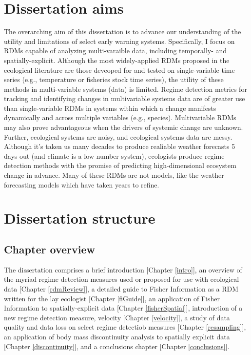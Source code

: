 \documentclass[12pt,twoside,openany]{reedthesis}
\begin{document}
\hypertarget{dissertation-aims}{%
\section{Dissertation aims}\label{dissertation-aims}}

The overarching aim of this dissertation is to advance our understanding of the utility and limitations of select early warning systems. Specifically, I focus on RDMs capable of analyzing multi-varaible data, including temporally- and spatially-explicit. Although the most widely-applied RDMs proposed in the ecological literature are those deveoped for and tested on single-variable time series (e.g., temperature or fisheries stock time series), the utility of these methods in multi-variable systems (data) is limited. Regime detection metrics for tracking and identifying changes in multivariable systems data are of greater use than single-variable RDMs in systems within which a change manifests dynamically and across multiple variables (e.g., species). Multivariable RDMs may also prove advantageous when the drivers of systemic change are unknown. Further, ecological systems are noisy, and ecological systems data are messy. Although it's taken us many decades to produce realiable weather forecasts 5 days out (and climate is a low-number system), ecologists produce regime detection methods with the promise of predicting high-dimensional ecosystem change in advance. Many of these RDMs are not models, like the weather forecasting models which have taken years to refine.

\hypertarget{dissertation-structure}{%
\section{Dissertation structure}\label{dissertation-structure}}

\hypertarget{chapter-overview}{%
\subsection{Chapter overview}\label{chapter-overview}}

The dissertation comprises a brief introduction {[}Chapter \ref{intro}{]}, an overview of the myriad regime detection measures used or proposed for use with ecological data {[}Chapter \ref{rdmReview}{]}, a detailed guide to Fisher Information as a RDM written for the lay ecologist {[}Chapter \ref{fiGuide}{]}, an application of Fisher Information to spatially-explicit data {[}Chapter \ref{fisherSpatial}{]}, introduction of a new regime detection measure, velocity {[}Chapter \ref{velocity}{]}, a study of data quality and data loss on select regime detectiob measures {[}Chapter \ref{resampling}{]}, an application of body mass discontinuity analysis to spatially explicit data {[}Chapter \ref{discontinuity}{]}, and a conclusions chapter {[}Chapter \ref{conclusions}{]}.
\end{document}
